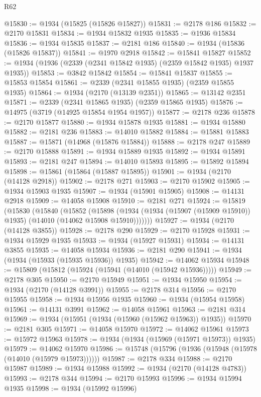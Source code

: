 \begin{lexlean}{R62}
\begin{coremodule}
@15830 := @1934 (@15825 (@15826 @15827))
@15831 := @2178 @186
@15832 := @2170 @15831
@15834 := @1934 @15832 @1935
@15835 := @1936 @15834
@15836 := @1934 @15835
@15837 := @2181 @186
@15840 := @1934 (@15836 (@15826 @15837))
@15841 := @1970 @2918
@15842 := @15841 @15827
@15852 := @1934 (@1936 (@2339 (@2341 @15842 @1935) (@2359 @15842 @1935) @1937 @1935))
@15853 := @3842 @15842
@15854 := @15841 @15837
@15855 := @15853 @15854
@15861 := @2339 (@2341 @15855 @1935) (@2359 @15855 @1935)
@15864 := @1934 (@2170 (@13139 @2351))
@15865 := @13142 @2351
@15871 := @2339 (@2341 @15865 @1935) (@2359 @15865 @1935)
@15876 := @14975 (@3719 (@14925 @15854 @1954 @1957))
@15877 := @2178 @236
@15878 := @2170 @15877
@15880 := @1934 @15878 @1935
@15881 := @1934 @15880
@15882 := @2181 @236
@15883 := @14010 @15882
@15884 := @15881 @15883
@15887 := @15871 (@14968 (@15876 @15884))
@15888 := @2178 @247
@15889 := @2170 @15888
@15891 := @1934 @15889 @1935
@15892 := @1934 @15891
@15893 := @2181 @247
@15894 := @14010 @15893
@15895 := @15892 @15894
@15898 := @15861 (@15864 (@15887 @15895))
@15901 := @1934 (@2170 (@14128 @2918))
@15902 := @2178 @271
@15903 := @2170 @15902
@15905 := @1934 @15903 @1935
@15907 := @1934 (@15901 @15905)
@15908 := @14131 @2918
@15909 := @14058 @15908
@15910 := @2181 @271
@15924 := @15819
    (@15830
      (@15840
        (@15852
          (@15898 (@1934 (@1934 (@15907 (@15909 @15910)) @1935) (@14010 (@14062 @15908 @15910)))))))
@15927 := @1934 (@2170 (@14128 @3855))
@15928 := @2178 @290
@15929 := @2170 @15928
@15931 := @1934 @15929 @1935
@15933 := @1934 (@15927 @15931)
@15934 := @14131 @3855
@15935 := @14058 @15934
@15936 := @2181 @290
@15941 := @1934 (@1934 (@15933 (@15935 @15936)) @1935)
@15942 := @14062 @15934
@15948 := @15809 (@15812 (@15924 (@15941 (@14010 (@15942 @15936)))))
@15949 := @2178 @305
@15950 := @2170 @15949
@15951 := @1934 @15950
@15954 := @1934 (@2170 (@14128 @3991))
@15955 := @2178 @314
@15956 := @2170 @15955
@15958 := @1934 @15956 @1935
@15960 := @1934 (@15954 @15958)
@15961 := @14131 @3991
@15962 := @14058 @15961
@15963 := @2181 @314
@15969 := @1934 (@15951 (@1934 (@15960 (@15962 @15963)) @1935))
@15970 := @2181 @305
@15971 := @14058 @15970
@15972 := @14062 @15961
@15973 := @15972 @15963
@15978 := @1934 (@1934 (@15969 (@15971 @15973)) @1935)
@15979 := @14062 @15970
@15986 := @15748 (@15796 (@1936 (@15948 (@15978 (@14010 (@15979 @15973))))))
@15987 := @2178 @334
@15988 := @2170 @15987
@15989 := @1934 @15988
@15992 := @1934 (@2170 (@14128 @4783))
@15993 := @2178 @344
@15994 := @2170 @15993
@15996 := @1934 @15994 @1935
@15998 := @1934 (@15992 @15996)

\end{coremodule}
\end{lexlean}
